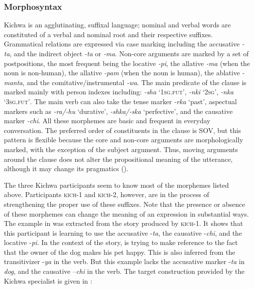 \documentclass[output=paper]{langscibook}
\begin{document}
\subsubsection{Morphosyntax}
Kichwa is an agglutinating, suffixal language; nominal and verbal words are constituted of a verbal and nominal root and their respective suffixes. Grammatical relations are expressed via case marking including the accusative \textit{-ta}, and the indirect object \textit{-ta} or \textit{-ma}. Non-core arguments are marked by a set of postpositions, the most frequent being the locative \textit{-pi}, the allative \textit{-ma} (when the noun is non-human), the allative \textit{\nobreakdash-pam} (when the noun is human), the ablative \textit{-manta}, and the comitative/instrumental \textit{-wa}. The main predicate of the clause is marked mainly with person indexes including: \textit{-sha} `1{\textsc{sg.fut}',} \textit{-nki }{`\textsc{2sg',}}\textit{ -nka} ‘3{\textsc{sg.fut’}}{. The main verb can also take the tense marker \textit{\nobreakdash-rka} ‘past’, aspectual markers such as \textit{-ra/-hu} ‘durative’, \textit{-shka/-ska} `perfective', and the causative marker \textit{\nobreakdash-chi}. All these morphemes are basic and frequent in everyday conversation. The preferred order of constituents in the clause is SOV, but this pattern is flexible because the core and non-core arguments are morphologically marked, with the exception of the subject argument. Thus, moving arguments around the clause does not alter the propositional meaning of the utterance, although it may change its pragmatics (\citealt{PapaCoquincheRosalesAlvarado2015}).}

The three Kichwa participants seem to know most of the morphemes listed above. Participants \textsc{kich-}1 and \textsc{kich-}2, however, are in the process of strengthening the proper use of these suffixes. Note that the presence or absence of these morphemes can change the meaning of an expression in substantial ways. The example in  was extracted from the story produced by \textsc{kich-}1. It shows that this participant is learning to use the accusative -\textit{ta}, the causative -\textit{chi}, and the locative -\textit{pi.} In the context of the story,  is trying to make reference to the fact that the owner of the dog makes his pet happy. This is also inferred from the transitivizer -\textit{ya} in the verb. But this example lacks the accusative marker -\textit{ta} in \textit{dog}, and the causative –\textit{chi} in the verb. The target construction provided by the Kichwa specialist is given in :%
\end{document}

